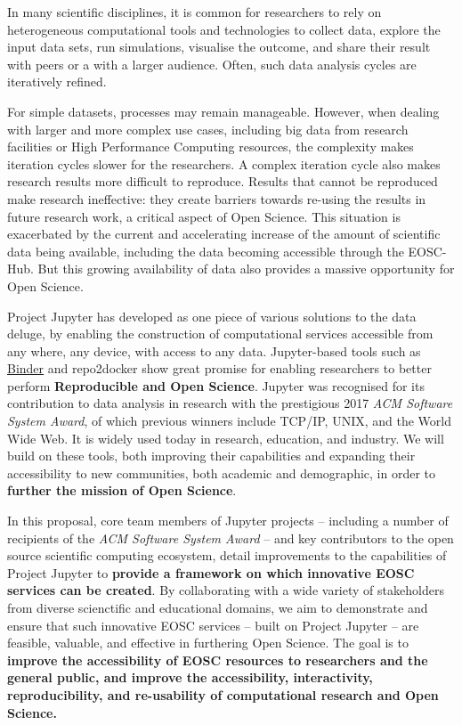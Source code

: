 
In many scientific disciplines, it is common for researchers to rely on
heterogeneous computational tools and technologies to collect data,
explore the input data sets, run simulations, visualise the outcome,
and share their result with peers or a with a larger audience. Often,
such data analysis cycles are iteratively refined.

For simple datasets, processes may remain manageable. However, when
dealing with larger and more complex use cases, including big data
from research facilities or High Performance Computing resources, the
complexity makes iteration cycles slower for the researchers. A
complex iteration cycle also makes research results more difficult to
reproduce.
Results that cannot be reproduced make research ineffective: they
create barriers towards re-using the results in future research work,
a critical aspect of Open Science.
This situation is exacerbated by the current and accelerating increase of the amount
of scientific data being available, including the data becoming
accessible through the EOSC-Hub. But this growing availability of data also provides a massive opportunity
for Open Science.

Project Jupyter has developed as one piece of various solutions to the data deluge,
by enabling the construction of computational services accessible from
any where, any device,
with access to any data. Jupyter-based tools such as \href{http://mybinder.org}{Binder} and repo2docker
show great promise for enabling researchers to better perform \textbf{Reproducible and Open Science}.
Jupyter was recognised for its contribution to data analysis in research with the prestigious 2017 \emph{ACM Software System Award}, of which previous winners include TCP/IP, UNIX, and the World Wide Web.
It is widely used today in research,
education, and industry.
We will build on these tools,
both improving their capabilities
and expanding their accessibility to new communities,
both academic and demographic,
in order to \textbf{further the mission of Open Science}.

In this proposal, core team members of Jupyter projects -- including a
number of recipients of the \emph{ACM Software System Award} -- and key contributors to the
open source scientific computing ecosystem,
detail improvements to the
capabilities of Project Jupyter
to \textbf{provide a framework on which innovative EOSC services can be created}.
By collaborating with a wide variety of stakeholders from diverse
scienctific and educational domains,
we aim to demonstrate and ensure that such
innovative EOSC services -- built on Project Jupyter -- are feasible, valuable, and effective in furthering Open Science.
The goal is to \textbf{improve the
accessibility of EOSC resources to researchers and the general public,
and improve the accessibility, interactivity, reproducibility, and
re-usability of computational research
and Open Science.}


